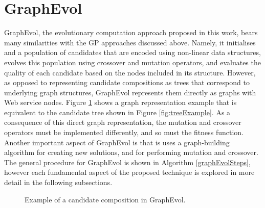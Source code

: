 \documentclass{article}
\begin{document}
\section{GraphEvol}\label{graphevol}
GraphEvol, the evolutionary computation approach proposed in this work, bears many similarities with the GP approaches discussed above. Namely, it initialises and a population 
of candidates that are encoded using non-linear data structures, evolves this population using crossover and mutation operators, and evaluates the quality of each candidate
based on the nodes included in its structure. However, as opposed to representing candidate compositions as trees that correspond to underlying graph structures, GraphEvol
represents them directly as graphs with Web service nodes. Figure \ref{fig:graphExample} shows a graph representation example that is equivalent to the candidate tree shown in Figure \ref{fig:treeExample}. As a consequence of this direct graph representation, the mutation and crossover operators must be implemented differently, and so must the fitness function. Another important aspect of GraphEvol is that is uses a graph-building algorithm for creating new  solutions, and for performing mutation and crossover. The general procedure for GraphEvol is shown in Algorithm \ref{graphEvolSteps}, however each fundamental aspect of the proposed technique is explored in more detail in the following subsections.

\begin{figure}
\centerline{
}
\caption{Example of a candidate composition in GraphEvol.}
\label{fig:graphExample}
\end{figure}
\end{document}

